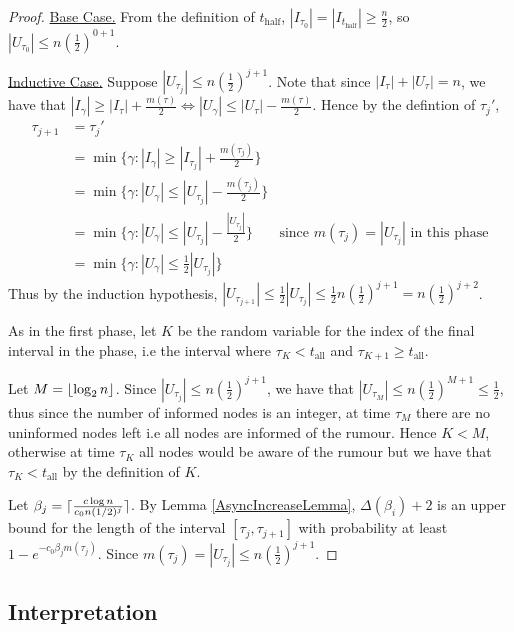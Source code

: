 \begin{proof}
	\underline{Base Case.}
	From the definition of $t_\text{half}$, $|I_{\tau_0}| = |I_{t_\text{half}}| \geq \frac{n}{2}$, so $|U_{\tau_0}| \leq n(\frac{1}{2})^{0+1}$.

	\underline{Inductive Case.} Suppose $|U_{\tau_j}| \leq n(\frac{1}{2})^{j+1}$. Note that since $|I_\tau| + |U_\tau| = n$, we have that $|I_{\gamma}| \geq |I_\tau| + \frac{m(\tau)}{2} \iff |U_\gamma| \leq |U_\tau| - \frac{m(\tau)}{2}$. Hence by the defintion of $\tau_j'$,
	\begin{align*}
		\tau_{j+1} &= \tau_j' \\
		&= \min \{ \gamma : |I_\gamma| \geq |I_{\tau_j}| + \frac{m(\tau_j)}{2}\} \\
		&= \min \{ \gamma : |U_\gamma| \leq |U_{\tau_j}| - \frac{m(\tau_j)}{2}\} \\
		&= \min \{ \gamma : |U_\gamma| \leq |U_{\tau_j}| - \frac{|U_{\tau_j}|}{2}\} & \text{since } m(\tau_j) = |U_{\tau_j}| \text{ in this phase} \\
		&= \min \{ \gamma : |U_\gamma| \leq \frac{1}{2}|U_{\tau_j}|\}
	\end{align*}
	Thus by the induction hypothesis, $|U_{\tau_{j+1}}| \leq \frac{1}{2}|U_{\tau_j}| \leq \frac{1}{2}n(\frac{1}{2})^{j+1} = n(\frac{1}{2})^{j+2}$.

	As in the first phase, let $K$ be the random variable for the index of the final interval in the phase, i.e the interval where $\tau_K < t_\text{all}$ and $\tau_{K+1} \geq t_\text{all}$.

	Let $M = \lfloor\log_2 n\rfloor$. Since $|U_{\tau_j}| \leq n(\frac{1}{2})^{j+1}$, we have that $|U_{\tau_M}| \leq n(\frac{1}{2})^{M+1} \leq \frac{1}{2}$, thus since the number of informed nodes is an integer, at time $\tau_M$ there are no uninformed nodes left i.e all nodes are informed of the rumour. Hence $K < M$, otherwise at time $\tau_K$ all nodes would be aware of the rumour but we have that $\tau_K < t_\text{all}$ by the definition of $K$.

	Let $\beta_j = \lceil\frac{c \log n}{c_0 n(1/2)^j}\rceil$. %
	By Lemma \ref{AsyncIncreaseLemma}, $\Delta(\beta_i) + 2$ is an upper bound for the length of the interval $[\tau_j, \tau_{j+1}]$ 
	with probability at least $1 - e^{-c_0\beta_j m(\tau_j)}$. %
	Since $m(\tau_j) = |U_{\tau_j}| \leq n(\frac{1}{2})^{j+1}$.

\end{proof}
\subsection{Interpretation}
 
